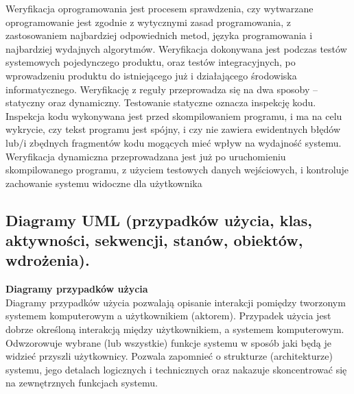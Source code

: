 \documentclass[a4paper,12pt,oneside]{book}
\begin{document}
                Weryfikacja oprogramowania jest procesem sprawdzenia, czy wytwarzane 
                oprogramowanie jest zgodnie z wytycznymi zasad programowania, z 
                zastosowaniem najbardziej odpowiednich metod, języka programowania i 
                najbardziej wydajnych algorytmów. Weryfikacja dokonywana jest podczas 
                testów systemowych pojedynczego produktu, oraz testów integracyjnych, po 
                wprowadzeniu produktu do istniejącego już i działającego środowiska 
                informatycznego.
                Weryfikację z reguły przeprowadza się na dwa sposoby – statyczny oraz 
                dynamiczny. Testowanie statyczne oznacza inspekcję kodu. Inspekcja kodu 
                wykonywana jest przed skompilowaniem programu, i ma na celu wykrycie, czy 
                tekst programu jest spójny, i czy nie zawiera ewidentnych błędów lub/i 
                zbędnych fragmentów kodu mogących mieć wpływ na wydajność systemu. 
                Weryfikacja dynamiczna przeprowadzana jest już po uruchomieniu 
                skompilowanego programu, z użyciem testowych danych wejściowych, i 
                kontroluje zachowanie systemu widoczne dla użytkownika
			\newpage\subsection{Diagramy UML (przypadków użycia, klas, aktywności, sekwencji, stanów, obiektów, wdrożenia).}
				\textbf{Diagramy przypadków użycia}\\
                Diagramy przypadków użycia pozwalają opisanie interakcji pomiędzy tworzonym systemem komputerowym a użytkownikiem (aktorem). Przypadek użycia jest dobrze określoną interakcją między użytkownikiem, a systemem komputerowym. Odwzorowuje wybrane (lub wszystkie) funkcje systemu w sposób jaki będą je widzieć przyszli użytkownicy. Pozwala zapomnieć o strukturze (architekturze) systemu, jego detalach logicznych i technicznych oraz nakazuje skoncentrować się na zewnętrznych funkcjach systemu.
\end{document}
